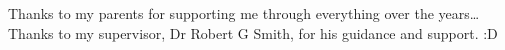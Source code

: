 \documentclass[
11pt, %
oneside, %
english, %
singlespacing, %
headsepline, %
]{style} %
\begin{document}
\begin{abstract}

\end{abstract}


\begin{acknowledgements}
	\addchaptertocentry{\acknowledgementname} %
	Thanks to my parents for supporting me through everything over the years\ldots
	\linebreak
	\linebreak
	Thanks to my supervisor, Dr Robert G Smith, for his guidance and support.
	\linebreak
	\linebreak
	:D
\end{acknowledgements}


\tableofcontents %

\listoffigures %

\listoftables %

\end{document}
